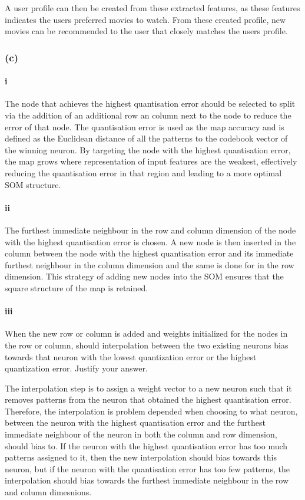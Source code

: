 \documentclass[10pt]{article}
\begin{document}
A user profile can then be created from these extracted features, as these features indicates the
users preferred movies to watch. From these created profile, new movies can be recommended to the
user that closely matches the users profile.

\subsubsection*{(c)}

\paragraph*{i}

The node that achieves the highest quantisation error should be selected to split via the addition
of an additional row an column next to the node to reduce the error of that node.
The quantisation error is used as the map accuracy and is defined as the Euclidean
distance of all the patterns to the codebook vector of the winning neuron.
By targeting the node with the highest quantisation
error, the map grows where representation of input features are the weakest, effectively
reducing the quantisation error in that region and leading to a more optimal SOM structure.

\paragraph*{ii}

The furthest immediate neighbour in the row and column dimension of the node with the
highest quantisation error is chosen. A new node is then inserted in the column between
the node with the highest quantisation error and its immediate furthest neighbour
in the column dimension and the same is done for in the row dimension. This strategy
of adding new nodes into the SOM ensures that the square structure of the map is retained.

\paragraph*{iii}

When the new row or column is added and weights initialized for the nodes in the row or column,
should interpolation between the two existing neurons bias towards that neuron with the lowest
quantization error or the highest quantization error. Justify your answer.

The interpolation step is to assign a weight vector to a new neuron such that it removes
patterns from the neuron that obtained the highest quantisation error. Therefore, the
interpolation is problem depended when choosing to what neuron, between the neuron
with the highest quantisation error and the furthest immediate neighbour of the neuron in both the column and row dimension,
should bias to. If the neuron with the highest quantisation error has too much patterns assigned to
it, then the new interpolation should bias towards this neuron, but if the neuron with the quantisation
error has too few patterns, the interpolation should bias towards the furthest immediate neighbour
in the row and column dimesnions.
\end{document}
